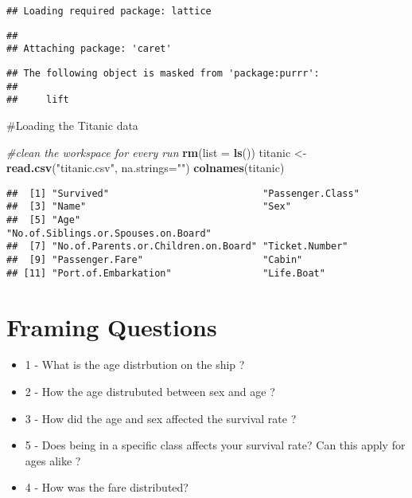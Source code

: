 \documentclass[]{article}
\newenvironment{Shaded}{\begin{snugshade}}{\end{snugshade}}
\newcommand{\CommentTok}[1]{\textcolor[rgb]{0.56,0.35,0.01}{\textit{#1}}}
\newcommand{\DataTypeTok}[1]{\textcolor[rgb]{0.13,0.29,0.53}{#1}}
\newcommand{\KeywordTok}[1]{\textcolor[rgb]{0.13,0.29,0.53}{\textbf{#1}}}
\newcommand{\NormalTok}[1]{#1}
\newcommand{\StringTok}[1]{\textcolor[rgb]{0.31,0.60,0.02}{#1}}
\providecommand{\tightlist}{%
  \setlength{\itemsep}{0pt}\setlength{\parskip}{0pt}}
\begin{document}
\begin{verbatim}
## Loading required package: lattice
\end{verbatim}

\begin{verbatim}
## 
## Attaching package: 'caret'
\end{verbatim}

\begin{verbatim}
## The following object is masked from 'package:purrr':
## 
##     lift
\end{verbatim}

\#Loading the Titanic data

\begin{Shaded}
\begin{Highlighting}[]
\CommentTok{#clean the workspace for every run}
\KeywordTok{rm}\NormalTok{(}\DataTypeTok{list =} \KeywordTok{ls}\NormalTok{())}
\NormalTok{titanic <-}\StringTok{ }\KeywordTok{read.csv}\NormalTok{(}\StringTok{"titanic.csv"}\NormalTok{, }\DataTypeTok{na.strings=}\StringTok{""}\NormalTok{)}
\KeywordTok{colnames}\NormalTok{(titanic)}
\end{Highlighting}
\end{Shaded}

\begin{verbatim}
##  [1] "Survived"                           "Passenger.Class"                   
##  [3] "Name"                               "Sex"                               
##  [5] "Age"                                "No.of.Siblings.or.Spouses.on.Board"
##  [7] "No.of.Parents.or.Children.on.Board" "Ticket.Number"                     
##  [9] "Passenger.Fare"                     "Cabin"                             
## [11] "Port.of.Embarkation"                "Life.Boat"
\end{verbatim}

\hypertarget{framing-questions}{%
\section{Framing Questions}\label{framing-questions}}

\begin{itemize}
\tightlist
\item
  1 - What is the age distrbution on the ship ?
\item
  2 - How the age distrubuted between sex and age ?
\item
  3 - How did the age and sex affected the survival rate ?
\item
  5 - Does being in a specific class affects your survival rate? Can
  this apply for ages alike ?
\item
  4 - How was the fare distributed?
\end{itemize}
\end{document}
